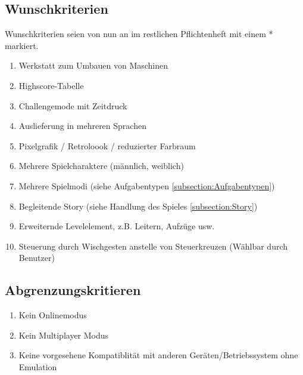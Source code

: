 \documentclass{scrartcl}
\begin{document}
\subsection{Wunschkriterien}
Wunschkriterien seien von nun an im restlichen Pflichtenheft mit einem * markiert.

\begin{enumerate}
	\item \label{wunsch:werkstatt}Werkstatt zum Umbauen von Maschinen
	\item \label{wunsch:highscore}Highscore-Tabelle
	\item \label{wunsch:challengemode}Challengemode mit Zeitdruck
	\item \label{wunsch:multilang}Auslieferung in mehreren Sprachen
	\item \label{wunsch:8bit}Pixelgrafik / Retroloook / reduzierter Farbraum
	\item \label{wunsch:multiplechar}Mehrere Spielcharaktere (männlich, weiblich)
	\item \label{wunsch:multiplemode}Mehrere Spielmodi (siehe Aufgabentypen \ref{subsection:Aufgabentypen})
    \item \label{wunsch:story}Begleitende Story (siehe Handlung des Spieles \ref{subsection:Story})
    \item \label{wunsch:erweiterndeLevelelemente}Erweiternde Levelelement, z.B. Leitern, Aufzüge usw.
    \item \label{wunsch:wischgesten} Steuerung durch Wischgesten anstelle von Steuerkreuzen (Wählbar durch Benutzer)
\end{enumerate}

\subsection{Abgrenzungskritieren}

\begin{enumerate}
	\item \label{abgrenz:online}Kein Onlinemodus
	\item \label{abgrenz:multiplayer}Kein Multiplayer Modus
	\item \label{abgrenz:emu}Keine vorgesehene Kompatiblität mit anderen Geräten/Betriebssystem ohne Emulation
\end{enumerate}

\clearpage
\end{document}
